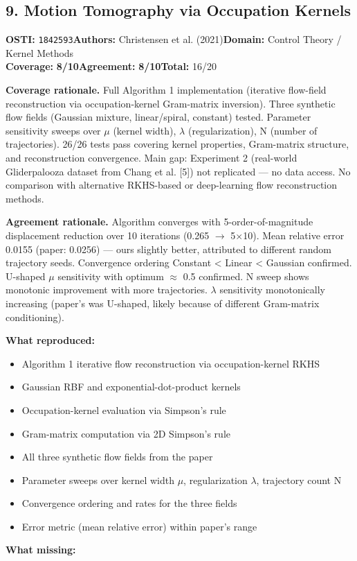\documentclass[11pt]{article}
\newcommand{\scorebadge}[2]{\textbf{#1:} \textbf{#2/10}}
\begin{document}
\subsection{9. Motion Tomography via Occupation Kernels}
\textbf{OSTI:} \texttt{1842593}\quad\textbf{Authors:} Christensen et al. (2021)\quad\textbf{Domain:} Control Theory / Kernel Methods\\
\scorebadge{Coverage}{8}\quad\scorebadge{Agreement}{8}\quad\textbf{Total:} 16/20\par\smallskip
\noindent\textbf{Coverage rationale.} Full Algorithm 1 implementation (iterative flow-field reconstruction via occupation-kernel Gram-matrix inversion). Three synthetic flow fields (Gaussian mixture, linear/spiral, constant) tested. Parameter sensitivity sweeps over $\mu$ (kernel width), $\lambda$ (regularization), N (number of trajectories). 26/26 tests pass covering kernel properties, Gram-matrix structure, and reconstruction convergence. Main gap: Experiment 2 (real-world Gliderpalooza dataset from Chang et al. [5]) not replicated --- no data access. No comparison with alternative RKHS-based or deep-learning flow reconstruction methods.\par
\noindent\textbf{Agreement rationale.} Algorithm converges with 5-order-of-magnitude displacement reduction over 10 iterations (0.265 $\rightarrow$ 5$\times$10). Mean relative error 0.0155 (paper: 0.0256) --- ours slightly better, attributed to different random trajectory seeds. Convergence ordering Constant \textless{} Linear \textless{} Gaussian confirmed. U-shaped $\mu$ sensitivity with optimum $\approx$ 0.5 confirmed. N sweep shows monotonic improvement with more trajectories. $\lambda$ sensitivity monotonically increasing (paper's was U-shaped, likely because of different Gram-matrix conditioning).\par\smallskip
\noindent\textbf{What reproduced:}
\begin{itemize}[leftmargin=1.4em,itemsep=0.2em,topsep=0.2em]
\item Algorithm 1 iterative flow reconstruction via occupation-kernel RKHS
\item Gaussian RBF and exponential-dot-product kernels
\item Occupation-kernel evaluation via Simpson's rule
\item Gram-matrix computation via 2D Simpson's rule
\item All three synthetic flow fields from the paper
\item Parameter sweeps over kernel width $\mu$, regularization $\lambda$, trajectory count N
\item Convergence ordering and rates for the three fields
\item Error metric (mean relative error) within paper's range
\end{itemize}\noindent\textbf{What missing:}
\end{document}
